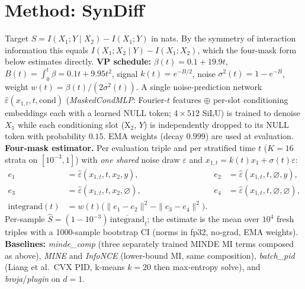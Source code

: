 \documentclass[11pt]{article}
\begin{document}
\section*{Method: SynDiff}
Target $S=I(X_1;Y\mid X_2)-I(X_1;Y)$ in nats. By the symmetry of interaction information this equals $I(X_1;X_2\mid Y)-I(X_1;X_2)$, which the four-mask form below estimates directly. \textbf{VP schedule:} $\beta(t)=0.1+19.9t$, $B(t)=\int_0^t\!\beta=0.1t+9.95t^2$, signal $k(t)=e^{-B/2}$, noise $\sigma^2(t)=1-e^{-B}$, weight $w(t)=\beta(t)/(2\sigma^2(t))$. A single noise-prediction network $\hat\varepsilon(x_{1,t},t,\mathrm{cond})$ (\emph{MaskedCondMLP}: Fourier-$t$ features $\oplus$ per-slot conditioning embeddings each with a learned NULL token; $4\times512$ SiLU) is trained to denoise $X_1$ while each conditioning slot (X$_2$, $Y$) is independently dropped to its NULL token with probability $0.15$. EMA weights (decay $0.999$) are used at evaluation.
\textbf{Four-mask estimator.} Per evaluation triple and per stratified time $t$ ($K{=}16$ strata on $[10^{-3},1]$) with \emph{one shared} noise draw $\varepsilon$ and $x_{1,t}=k(t)x_1+\sigma(t)\varepsilon$:
\begin{align*}e_1&=\hat\varepsilon(x_{1,t},t,x_2,y), & e_2&=\hat\varepsilon(x_{1,t},t,\varnothing,y),\\e_3&=\hat\varepsilon(x_{1,t},t,x_2,\varnothing), & e_4&=\hat\varepsilon(x_{1,t},t,\varnothing,\varnothing),\\\text{integrand}(t)&=w(t)\big(\|e_1-e_2\|^2-\|e_3-e_4\|^2\big).&&\end{align*}
Per-sample $\hat S=(1-10^{-3})\,\overline{\text{integrand}}_t$; the estimate is the mean over $10^4$ fresh triples with a 1000-sample bootstrap CI (norms in fp32, no-grad, EMA weights). \textbf{Baselines:} \emph{minde\_comp} (three separately trained MINDE MI terms composed as above), \emph{MINE} and \emph{InfoNCE} (lower-bound MI, same composition), \emph{batch\_pid} (Liang et al.\ CVX PID, k-means $k{=}20$ then max-entropy solve), and \emph{broja}/\emph{plugin} on $d{=}1$.
\end{document}
